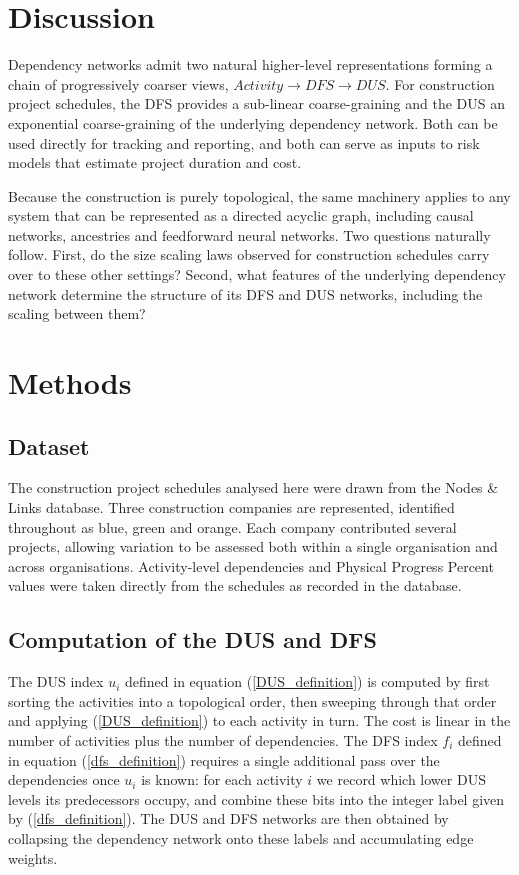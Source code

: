 \documentclass[11pt,a4paper]{article}
\begin{document}
\section*{Discussion}

Dependency networks admit two natural higher-level representations forming a chain of progressively coarser views, $\textit{Activity} \to \textit{DFS} \to \textit{DUS}$. For construction project schedules, the DFS provides a sub-linear coarse-graining and the DUS an exponential coarse-graining of the underlying dependency network. Both can be used directly for tracking and reporting, and both can serve as inputs to risk models that estimate project duration and cost.

Because the construction is purely topological, the same machinery applies to any system that can be represented as a directed acyclic graph, including causal networks, ancestries and feedforward neural networks. Two questions naturally follow. First, do the size scaling laws observed for construction schedules carry over to these other settings? Second, what features of the underlying dependency network determine the structure of its DFS and DUS networks, including the scaling between them?

\section*{Methods}

\subsection*{Dataset}

The construction project schedules analysed here were drawn from the Nodes \& Links database. Three construction companies are represented, identified throughout as blue, green and orange. Each company contributed several projects, allowing variation to be assessed both within a single organisation and across organisations. Activity-level dependencies and Physical Progress Percent values were taken directly from the schedules as recorded in the database.

\subsection*{Computation of the DUS and DFS}

The DUS index $u_i$ defined in equation (\ref{DUS_definition}) is computed by first sorting the activities into a topological order, then sweeping through that order and applying (\ref{DUS_definition}) to each activity in turn. The cost is linear in the number of activities plus the number of dependencies. The DFS index $f_i$ defined in equation (\ref{dfs_definition}) requires a single additional pass over the dependencies once $u_i$ is known: for each activity $i$ we record which lower DUS levels its predecessors occupy, and combine these bits into the integer label given by (\ref{dfs_definition}). The DUS and DFS networks are then obtained by collapsing the dependency network onto these labels and accumulating edge weights.
\end{document}
